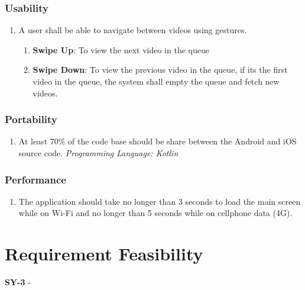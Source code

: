 \documentclass[a4paper,10pt]{article}
\begin{document}
\subsubsection{Usability}
\begin{enumerate}[label=USE-\arabic*]
    \item A user shall be able to navigate between videos using gestures.
    \begin{enumerate}[label=USE-1.\arabic*]
        \item \textbf{Swipe Up}: To view the next video in the queue
        \item \textbf{Swipe Down}: To view the previous video in the queue, 
        if its the first video in the queue, the system shall empty the queue 
        and fetch new videos.
    \end{enumerate}
\end{enumerate}

\subsubsection{Portability}
\begin{enumerate}[label=POR-\arabic*]
    \item At least 70\% of the code base should be share between the Android
    and iOS source code. \textit{Programming Language: Kotlin}
\end{enumerate}

\subsubsection{Performance}
\begin{enumerate}[label=PER-\arabic*]
    \item The application should take no longer than 3 seconds to load the 
    main screen while on Wi-Fi and no longer than 5 seconds while on 
    cellphone data (4G).
\end{enumerate}

\pagebreak

\section{Requirement Feasibility}
\textbf{SY-3} -  
\end{document}
